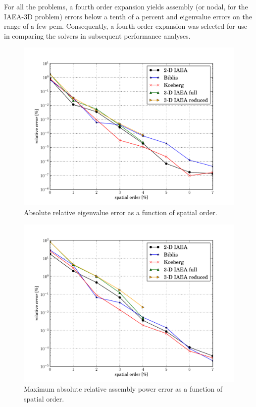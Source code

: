 
For all the problems, a fourth order expansion yields assembly 
(or nodal, for the IAEA-3D problem) errors below a tenth of a percent 
and eigenvalue errors on the range of a few pcm.  Consequently, a fourth 
order expansion was selected for use in comparing the solvers in 
subsequent performance analyses.

\begin{figure}[ht]
    \centering
    \includegraphics[keepaspectratio, width = 3.5 in]
                    {diffusion_order_study_eigenvalue}
    \caption{Absolute relative eigenvalue error as 
             a function of spatial order.}
    \label{fig:diffusion_order_study_eigenvalue}
\end{figure}

\begin{figure}[ht]
    \centering
    \includegraphics[keepaspectratio, width = 3.5 in]
                    {diffusion_order_study_power}
    \caption{Maximum absolute relative assembly power error as a function of 
             spatial order.}
    \label{fig:diffusion_order_study_power}
\end{figure}

